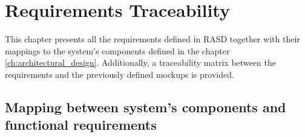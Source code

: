 \chapter{Requirements Traceability} \label{ch:requirements_traceability}

This chapter presents all the requirements defined in RASD together with their mappings to the system's components defined in the chapter \ref{ch:architectural_design}. Additionally, a traceability matrix between the requirements and the previously defined mockups is provided.

\section{Mapping between system's components and functional requirements}


